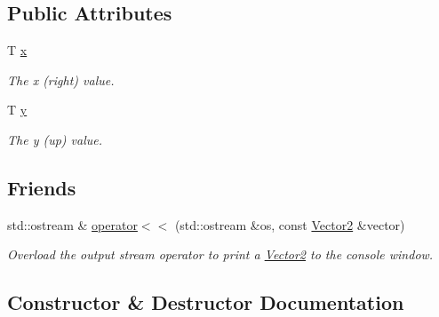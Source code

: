 \subsection*{Public Attributes}
\begin{DoxyCompactItemize}
\item 
T \hyperlink{classsparky_1_1_vector2_a30306429883f3c66f7f0170cab1b3cdf}{x}\hypertarget{classsparky_1_1_vector2_a30306429883f3c66f7f0170cab1b3cdf}{}\label{classsparky_1_1_vector2_a30306429883f3c66f7f0170cab1b3cdf}

\begin{DoxyCompactList}\small\item\em The x (right) value. \end{DoxyCompactList}\item 
T \hyperlink{classsparky_1_1_vector2_ad56ad07afb25296661c4ded07a5a795c}{y}\hypertarget{classsparky_1_1_vector2_ad56ad07afb25296661c4ded07a5a795c}{}\label{classsparky_1_1_vector2_ad56ad07afb25296661c4ded07a5a795c}

\begin{DoxyCompactList}\small\item\em The y (up) value. \end{DoxyCompactList}\end{DoxyCompactItemize}
\subsection*{Friends}
\begin{DoxyCompactItemize}
\item 
std\+::ostream \& \hyperlink{classsparky_1_1_vector2_a9fc2efab2b5d63c84f76fa8f036bec0c}{operator$<$$<$} (std\+::ostream \&os, const \hyperlink{classsparky_1_1_vector2}{Vector2} \&vector)
\begin{DoxyCompactList}\small\item\em Overload the output stream operator to print a \hyperlink{classsparky_1_1_vector2}{Vector2} to the console window. \end{DoxyCompactList}\end{DoxyCompactItemize}


\subsection{Constructor \& Destructor Documentation}
